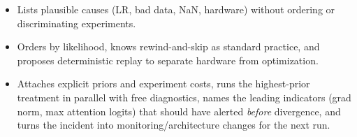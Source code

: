 \begin{interviewq}

\goodgreat
\begin{itemize}
    \item {} Lists plausible causes (LR, bad data, NaN, hardware) without ordering or discriminating experiments.
    \item {} Orders by likelihood, knows rewind-and-skip as standard practice, and proposes deterministic replay to separate hardware from optimization.
    \item {} Attaches explicit priors and experiment costs, runs the highest-prior treatment in parallel with free diagnostics, names the leading indicators (grad norm, max attention logits) that should have alerted \emph{before} divergence, and turns the incident into monitoring/architecture changes for the next run.
\end{itemize}

\end{interviewq}

